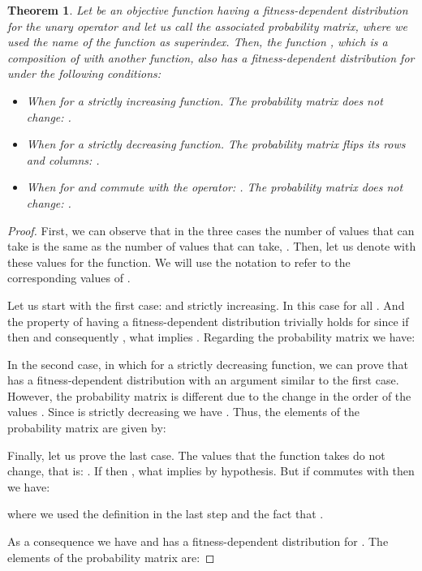 \documentclass{article}
\newtheorem{theorem}{Theorem}
\begin{document}
\begin{theorem}
\label{thm:transformation}
Let  be an objective function having a fitness-dependent distribution for the unary operator  and let us call  the associated probability matrix, where we used the name of the function as superindex.
Then, the function , which is a composition of  with another function, also has a fitness-dependent distribution for  under the following conditions:
\begin{itemize}
\item When  for  a strictly increasing function. The probability matrix does not change: .
\item When  for  a strictly decreasing function. The probability matrix flips its rows and columns: .
\item When  for  and  commute with the  operator: . The probability matrix does not change: .
\end{itemize}
\end{theorem}
\begin{proof}
First, we can observe that in the three cases the number of values that  can take is the same as the number of values that  can take, . Then, let us denote with  these values for the  function. We will use the notation  to refer to the corresponding values of .

Let us start with the first case:  and  strictly increasing. In this case  for all . And the property of having a fitness-dependent distribution trivially holds for  since if  then  and consequently , what implies . Regarding the probability matrix we have:


In the second case, in which  for  a strictly decreasing function, we can prove that  has a fitness-dependent distribution with an argument similar to the first case. However, the probability matrix is different due to the change in the order of the values . Since  is strictly decreasing we have . Thus, the elements of the probability matrix are given by:


Finally, let us prove the last case. The values that the function takes do not change, that is: . If  then , what implies  by hypothesis. But if  commutes with  then we have:

where we used the definition  in the last step and the fact that .

As a consequence we have  and  has a fitness-dependent distribution for . The elements of the probability matrix are:



\end{proof}
\end{document}

